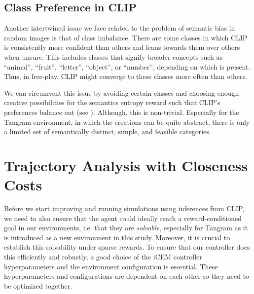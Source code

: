 \subsection{Class Preference in CLIP}
\label{sec:class-preference}
Another intertwined issue we face related to the problem of semantic bias in random images is that of class imbalance.
There are some classes in which CLIP is consistently more confident than others and leans towards them over others when unsure.
This includes classes that signify broader concepts such as ``animal'', ``fruit'', ``letter'', ``object'', or ``number'', depending on which is present.
Thus, in free-play, CLIP might converge to these classes more often than others.


We can circumvent this issue by avoiding certain classes and choosing enough creative possibilities for the semantics entropy reward such that CLIP's preferences balance out (see ).
Although, this is non-trivial.
Especially for the Tangram environment, in which the creations can be quite abstract, there is only a limited set of semantically distinct, simple, and feasible categories.

\section{Trajectory Analysis with Closeness Costs}
\label{sec:closeness-rollouts}
Before we start improving and running simulations using inferences from CLIP, we need to also ensure that the agent could ideally reach a reward-conditioned goal in our environments, i.e. that they are \emph{solvable}, especially for Tangram as it is introduced as a new environment in this study.
Moreover, it is crucial to establish this solvability under sparse rewards.
To ensure that our controller does this efficiently and robustly, a good choice of the iCEM controller hyperparameters and the environment configuration is essential.
These hyperparameters and configurations are dependent on each other so they need to be optimized together.


